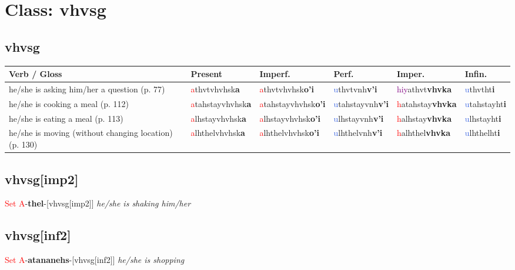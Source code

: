 \documentclass[oneside,openany]{book}%
\begin{document}
\section*{Class: vhvsg}%
%
\needspace{1in}%
\subsection*{vhvsg}%
\begin{tabularx}{\textwidth}{>{\hsize=1.5\hsize\RaggedRight}X >{\hsize=0.9\hsize}X >{\hsize=0.9\hsize}X >{\hsize=0.9\hsize}X >{\hsize=0.9\hsize}X >{\hsize=0.9\hsize}X}%
\toprule%
\textbf{Verb / Gloss}&\textbf{Present}&\textbf{Imperf.}&\textbf{Perf.}&\textbf{Imper.}&\textbf{Infin.}\\%
\midrule%
he/she is asking him/her a question (p. 77)&\textcolor{Red}{a}thvtvhvhsk\textbf{a}&\textcolor{Red}{a}thvtvhvhsk\textbf{o'i}&\textcolor{RoyalBlue}{u}thvtvnh\textbf{v'i}&\textcolor{Purple}{hiy}athvt\textbf{vhvka}&\textcolor{RoyalBlue}{u}thvtht\textbf{i}\\%
he/she is cooking a meal (p. 112)&\textcolor{Red}{a}tahstayvhvhsk\textbf{a}&\textcolor{Red}{a}tahstayvhvhsk\textbf{o'i}&\textcolor{RoyalBlue}{u}tahstayvnh\textbf{v'i}&\textcolor{Red}{h}atahstay\textbf{vhvka}&\textcolor{RoyalBlue}{u}tahstayht\textbf{i}\\%
he/she is eating a meal (p. 113)&\textcolor{Red}{a}lhstayvhvhsk\textbf{a}&\textcolor{Red}{a}lhstayvhvhsk\textbf{o'i}&\textcolor{RoyalBlue}{u}lhstayvnh\textbf{v'i}&\textcolor{Red}{h}alhstay\textbf{vhvka}&\textcolor{RoyalBlue}{u}lhstayht\textbf{i}\\%
he/she is moving (without changing location) (p. 130)&\textcolor{Red}{a}lhthelvhvhsk\textbf{a}&\textcolor{Red}{a}lhthelvhvhsk\textbf{o'i}&\textcolor{RoyalBlue}{u}lhthelvnh\textbf{v'i}&\textcolor{Red}{h}alhthel\textbf{vhvka}&\textcolor{RoyalBlue}{u}lhthelht\textbf{i}\\%
\bottomrule%
\end{tabularx}%
\vspace{1em}%
\needspace{1in}%
\subsection*{vhvsg[imp2]}%
\textcolor{Red}{Set A}{-}\textbf{thel}{-}[vhvsg[imp2]] \textit{ he/she is shaking him/her} \\%
\vspace{1em}%
\needspace{1in}%
\subsection*{vhvsg[inf2]}%
\textcolor{Red}{Set A}{-}\textbf{atananehs}{-}[vhvsg[inf2]] \textit{ he/she is shopping} \\%
\vspace{1em}%
\needspace{3in}%
\end{document}
